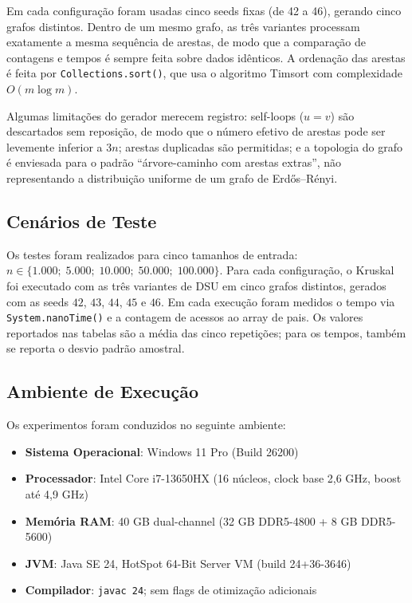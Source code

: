 \documentclass[12pt]{article}
\begin{document}
Em cada configuração foram usadas cinco seeds fixas (de 42 a 46), gerando cinco grafos distintos. Dentro de um mesmo grafo, as três variantes processam exatamente a mesma sequência de arestas, de modo que a comparação de contagens e tempos é sempre feita sobre dados idênticos. A ordenação das arestas é feita por \texttt{Collections.sort()}, que usa o algoritmo Timsort com complexidade $O(m \log m)$.

Algumas limitações do gerador merecem registro: self-loops ($u = v$) são descartados sem reposição, de modo que o número efetivo de arestas pode ser levemente inferior a $3n$; arestas duplicadas são permitidas; e a topologia do grafo é enviesada para o padrão ``árvore-caminho com arestas extras'', não representando a distribuição uniforme de um grafo de Erd\H{o}s--R\'enyi.

\subsection{Cenários de Teste}

Os testes foram realizados para cinco tamanhos de entrada: $n \in \{1.000;\; 5.000;\; 10.000;\; 50.000;\; 100.000\}$. Para cada configuração, o Kruskal foi executado com as três variantes de DSU em cinco grafos distintos, gerados com as seeds $42$, $43$, $44$, $45$ e $46$. Em cada execução foram medidos o tempo via \texttt{System.nanoTime()} e a contagem de acessos ao array de pais. Os valores reportados nas tabelas são a média das cinco repetições; para os tempos, também se reporta o desvio padrão amostral.

\subsection{Ambiente de Execução}

Os experimentos foram conduzidos no seguinte ambiente:

\begin{itemize}
  \item \textbf{Sistema Operacional}: Windows 11 Pro (Build 26200)
  \item \textbf{Processador}: Intel Core i7-13650HX (16 núcleos, clock base 2,6 GHz, boost até 4,9 GHz)
  \item \textbf{Memória RAM}: 40 GB dual-channel (32 GB DDR5-4800 + 8 GB DDR5-5600)
  \item \textbf{JVM}: Java SE 24, HotSpot 64-Bit Server VM (build 24+36-3646)
  \item \textbf{Compilador}: \texttt{javac 24}; sem flags de otimização adicionais
\end{itemize}
\end{document}
